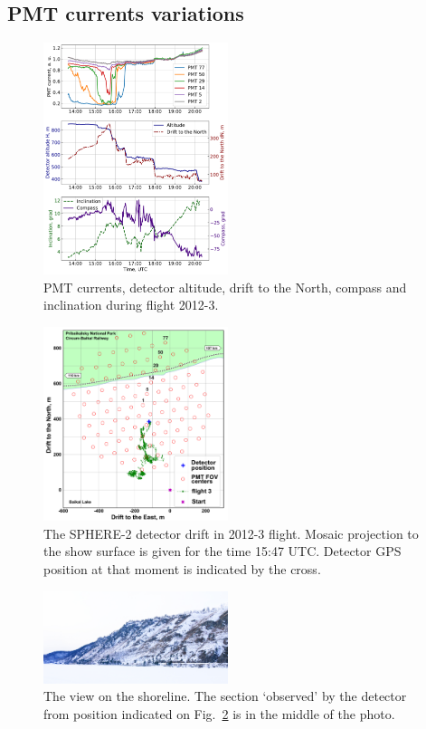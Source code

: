 \documentclass[final,5p,times,twocolumn]{elsarticle}
\begin{document}
\subsection{PMT currents variations}

\begin{figure}[tb]
    \includegraphics[width=0.48\textwidth]{2012-3_currents_H_dN.pdf}
    \caption{PMT currents, detector altitude, drift to the North, compass and inclination during flight 2012-3.}
    \label{fig:2012-3_currents}
\end{figure}

\begin{figure}[tb]
    \includegraphics[width=0.48\textwidth]{2012_drift-mod.pdf}
    \caption{The SPHERE-2 detector drift in 2012-3 flight. Mosaic projection to the show surface is given for the time 15:47 UTC. Detector GPS position at that moment is indicated by the cross.}
    \label{fig:2012-drift}
\end{figure}

\begin{figure}[tb]
    \includegraphics[width=0.48\textwidth]{DSC_7256_1.jpg}
    \caption{The view on the shoreline. The section `observed' by the detector from position indicated on Fig.~\ref{fig:2012-drift} is in the middle of the photo.}
    \label{fig:2012--shore-view}
\end{figure}
\end{document}
